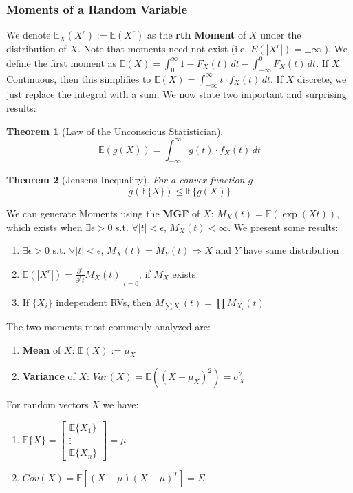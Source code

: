 \documentclass[]{article}
\theoremstyle{mattstyle}
\newtheorem{theorem}{Theorem}[section]
\theoremstyle{definition}
\begin{document}
\subsubsection{Moments of a Random Variable}
We denote \(\mathbb{E}_X(X^r) := \mathbb{E}(X^r)\) as the \textbf{rth Moment} of \(X\) under the distribution of \(X\). Note that moments need not exist (i.e. \(E(|X^r|)=\pm\infty\) ). We define the first moment as \(\mathbb{E}(X) = \int_0^\infty 1 - F_X(t)\,dt - \int_{-\infty}^0 F_X(t)\,dt\). If \(X\) Continuous, then this simplifies to \(\mathbb{E}(X) = \int_{-\infty}^{\infty} t \cdot f_X(t)\,dt\). If $X$ discrete, we just replace the integral with a sum. We now state two important and surprising results:

\begin{theorem}[Law of the Unconscious Statistician]
$$\mathbb{E}(g(X)) = \int_{-\infty}^{\infty} g(t) \cdot f_X(t)\,dt$$
\end{theorem}

\begin{theorem}[Jensens Inequality]
	For a convex function $g$ $$g(\mathbb{E}\{X\})\le\mathbb{E}\{g(X)\}$$
\end{theorem}

We can generate Moments using the \textbf{MGF} of \(X\): \( M_X(t) = \mathbb{E} \left(\exp(Xt) \right) \), which exists when \( \exists \epsilon >0 \) s.t. \( \forall |t| < \epsilon\),  \(M_X(t) < \infty \). We present some results:
\begin{enumerate}
	\item \( \exists \epsilon >0 \) s.t. \( \forall |t| < \epsilon\),  \(M_X(t) = M_Y(t) \Rightarrow X\) and \(Y\) have same distribution
	\item \(\mathbb{E}(|X^r|) = \left.\frac{\partial^r}{\partial^r t}M_X(t)\right\rvert_{t=0}\), if \(M_X\) exists.
	\item If \(\{ X_i\}\) independent RVs, then \( M_{\sum X_i} (t) = \prod M_{X_i}(t)\)
\end{enumerate}
The two moments most commonly analyzed are:
\begin{enumerate}
	\item \textbf{Mean} of \(X\): \(\mathbb{E}(X):=\mu_X\)
	\item \textbf{Variance} of \(X\): \(Var(X)=\mathbb{E}((X-\mu_{X})^2)=\sigma^2_{X}\)
\end{enumerate}
For random vectors \(X\) we have:
\begin{enumerate}
	\item \(\mathbb{E}\{X\} = \begin{bmatrix}
	\mathbb{E}\{X_1\} \\
	\vdots \\
	\mathbb{E}\{X_n\}
	\end{bmatrix}=\mu\)
	\item \(Cov(X)= \mathbb{E}[(X-\mu)(X-\mu)^T] = \Sigma\)
\end{enumerate}
\end{document}
